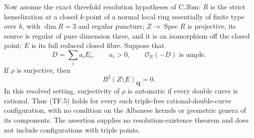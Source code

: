 Now assume the exact threefold resolution hypotheses of C.3bm:
$R$ is the strict henselization at a closed $k$-point of a normal
local ring essentially of finite type over $k$, with $\dim R=3$ and
regular puncture;
$Z\to\operatorname{Spec}R$ is projective, its source is regular of pure
dimension three, and it is an isomorphism off the closed point; $E$ is its full
reduced closed fibre. Suppose that
\[
 D=\sum_i a_iE_i,\qquad a_i>0,\qquad
                         \mathcal O_E(-D)\text{ is ample}.
\]
If $\rho$ is surjective, then
\begin{equation}
                    B^2(Z\setminus E)_{\mathbf Q}=0.     \tag{TF.5}
\end{equation}
In this resolved setting, surjectivity of $\rho$ is automatic if every
double curve is rational. Thus (TF.5) holds for every such triple-free
rational-double-curve configuration, with no condition on the
Albanese kernels or geometric genera of its components.
The assertion supplies no resolution-existence theorem and does not
include configurations with triple points.

